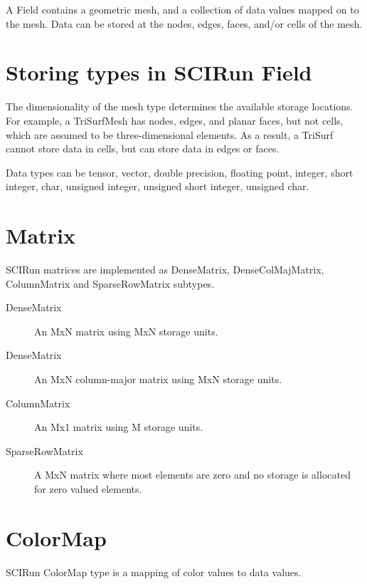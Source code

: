 \documentclass[fleqn,12pt,openany]{book}
\begin{document}
A Field contains a geometric mesh, and a collection of data values mapped on to the mesh.
Data can be stored at the nodes, edges, faces, and/or cells of the mesh.

\section{Storing types in SCIRun Field}

The dimensionality of the mesh type determines the available storage locations.
For example, a TriSurfMesh has nodes, edges, and planar faces, but not cells, which are assumed
to be three-dimensional elements.
As a result, a TriSurf cannot store data in cells, but can store data in edges or faces. 

Data types can be tensor, vector, double precision, floating point, integer, short integer, char,
unsigned integer, unsigned short integer, unsigned char.

\section{Matrix}

SCIRun matrices are implemented as DenseMatrix, DenseColMajMatrix, ColumnMatrix
and SparseRowMatrix subtypes.

\begin{description}
  \item[DenseMatrix]
  An MxN matrix using MxN storage units.
 
  \item[DenseMatrix]
  An MxN column-major matrix using MxN storage units.

  \item[ColumnMatrix]
  An Mx1 matrix using M storage units.
 
  \item[SparseRowMatrix]
  A MxN matrix where most elements are zero and no storage is allocated for zero valued elements. 
\end{description}
 
\section{ColorMap}
 
 SCIRun ColorMap type is a mapping of color values to data values.
 
\end{document}
